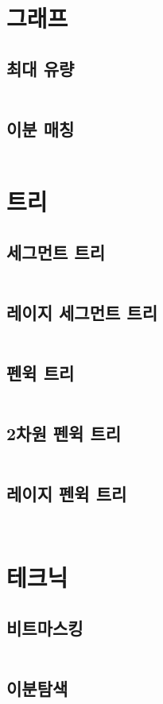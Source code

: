 \documentclass{article}
\begin{document}
\begin{multicols}{2}
\section{그래프}
\subsection{최대 유량}
\inputminted[linenos, breaklines]{python}{codes/mf.py}
\subsection{이분 매칭}
\inputminted[linenos, breaklines]{python}{codes/bimatch.py}

\section{트리}
\subsection{세그먼트 트리}
\inputminted[linenos, breaklines]{cpp}{codes/segtree.cpp}
\subsection{레이지 세그먼트 트리}
\inputminted[linenos, breaklines]{cpp}{codes/lazyseg.cpp}
\subsection{펜윅 트리}
\inputminted[linenos, breaklines]{python}{codes/fenwick.py}
\subsection{2차원 펜윅 트리}
\inputminted[linenos, breaklines]{python}{codes/fenwick2d.py}
\subsection{레이지 펜윅 트리}
\inputminted[linenos, breaklines]{cpp}{codes/lazyfenwick.cpp}
\inputminted[linenos, breaklines]{python}{codes/lazyfenwick.py}
\section{테크닉}
\subsection{비트마스킹}
\inputminted[linenos, breaklines]{python}{codes/bit.py}
\subsection{이분탐색}
\inputminted[linenos, breaklines]{python}{codes/bisect.py}


\end{multicols}
\end{document}
